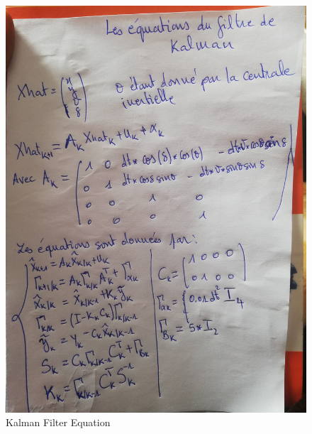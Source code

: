 \begin{figure}[!ht]
    \begin{center}
        \includegraphics[scale=0.6]{Images/Equation_filtre_K.jpg}
    \end{center}
    \caption{Kalman Filter Equation}
    \label{fig:Equation}
\end{figure}

